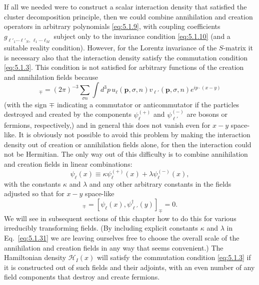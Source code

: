 If all we needed were to construct a scalar interaction density that
satisfied the cluster decomposition principle, then we could combine
annihilation and creation operators in arbitrary polynomials \eqref{eq:5.1.9}, with
coupling coefficients $g_{\ell'_1\cdots\ell'_N,\,\ell_1\cdots\ell_M}$ subject
only to the invariance condition \eqref{eq:5.1.10} (and a suitable reality condition).
However, for the Lorentz invariance of the $S$-matrix it is necessary also
that the interaction density satisfy the commutation condition \eqref{eq:5.1.3}.
This condition is not satisfied for arbitrary functions of the creation and
annihilation fields because
\begin{equation}
  [\psi^{(+)}_\ell(x),\psi^{(-)}_{\ell'}(y)]_\mp
  =(2\pi)^{-3}\sum_{\sigma n}\int d^3p\,
  u_\ell(\mathbf{p},\sigma,n)v_{\ell'}(\mathbf{p},\sigma,n)
  e^{ip\cdot(x-y)}
  \tag{5.1.30}\label{eq:5.1.30}
\end{equation}
(with the sign $\mp$ indicating a commutator or anticommutator if the particles
destroyed and created by the components $\psi^{(+)}_\ell$ and
$\psi^{(-)}_{\ell'}$ are bosons or fermions, respectively,) and in general this
does not vanish even for $x-y$ space-like. It is obviously not possible to
avoid this problem by making the interaction density out of creation or
annihilation fields alone, for then the interaction could not be Hermitian.
The only way out of this difficulty is to combine annihilation and creation
fields in linear combinations:
\begin{equation}
  \psi_\ell(x)\equiv\kappa\psi^{(+)}_\ell(x)
  +\lambda\psi^{(-)}_\ell(x),
  \tag{5.1.31}\label{eq:5.1.31}
\end{equation}
with the constants $\kappa$ and $\lambda$ and any other arbitrary constants
in the fields adjusted so that for $x-y$ space-like
\begin{equation}
  [\psi_\ell(x),\psi_{\ell'}(y)]_\mp
  =[\psi_\ell(x),\psi^\dagger_{\ell'}(y)]_\mp=0.
  \tag{5.1.32}\label{eq:5.1.32}
\end{equation}
We will see in subsequent sections of this chapter how to do this for various
irreducibly transforming fields. (By including explicit constants $\kappa$ and
$\lambda$ in Eq.~\eqref{eq:5.1.31} we are leaving ourselves free to choose the overall
scale of the annihilation and creation fields in any way that seems convenient.)
The Hamiltonian density $\mathcal{H}_I(x)$ will satisfy the commutation
condition \eqref{eq:5.1.3} if it is constructed out of such fields and their adjoints,
with an even number of any field components that destroy and create fermions.

